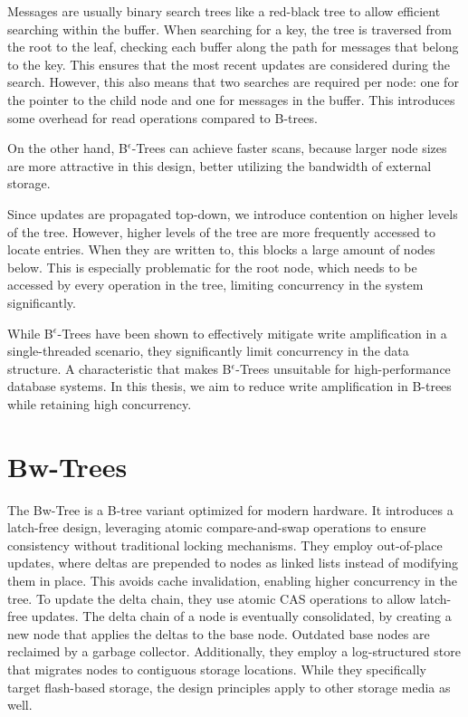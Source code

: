 Messages are usually binary search trees like a red-black tree to allow efficient searching within the buffer.
When searching for a key, the tree is traversed from the root to the leaf, checking each buffer along the path for messages that belong to the key.
This ensures that the most recent updates are considered during the search.
However, this also means that two searches are required per node: one for the pointer to the child node and one for messages in the buffer.
This introduces some overhead for read operations compared to B-trees.

On the other hand, B$^\epsilon$-Trees can achieve faster scans, because larger node sizes are more attractive in this design, better utilizing the bandwidth of external storage.

Since updates are propagated top-down, we introduce contention on higher levels of the tree.
However, higher levels of the tree are more frequently accessed to locate entries.
When they are written to, this blocks a large amount of nodes below.
This is especially problematic for the root node, which needs to be accessed by every operation in the tree, limiting concurrency in the system significantly.

While B$^\epsilon$-Trees have been shown to effectively mitigate write amplification in a single-threaded scenario, they significantly limit concurrency in the data structure.
A characteristic that makes B$^\epsilon$-Trees unsuitable for high-performance database systems.
In this thesis, we aim to reduce write amplification in B-trees while retaining high concurrency.


\section{Bw-Trees}
The Bw-Tree \cite{levandoski2013bw} is a B-tree variant optimized for modern hardware.
It introduces a latch-free design, leveraging atomic compare-and-swap operations to ensure consistency without traditional locking mechanisms.
They employ out-of-place updates, where deltas are prepended to nodes as linked lists instead of modifying them in place.
This avoids cache invalidation, enabling higher concurrency in the tree.
To update the delta chain, they use atomic \ac{CAS} operations to allow latch-free updates.
The delta chain of a node is eventually consolidated, by creating a new node that applies the deltas to the base node.
Outdated base nodes are reclaimed by a garbage collector.
Additionally, they employ a log-structured store that migrates nodes to contiguous storage locations.
While they specifically target flash-based storage, the design principles apply to other storage media as well.

